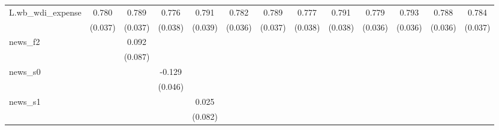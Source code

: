 {\begin{tabular}{l*{12}{c}}
\addlinespace
L.wb\_wdi\_expense&       0.780\sym{***}&       0.789\sym{***}&       0.776\sym{***}&       0.791\sym{***}&       0.782\sym{***}&       0.789\sym{***}&       0.777\sym{***}&       0.791\sym{***}&       0.779\sym{***}&       0.793\sym{***}&       0.788\sym{***}&       0.784\sym{***}\\
            &     (0.037)         &     (0.037)         &     (0.038)         &     (0.039)         &     (0.036)         &     (0.037)         &     (0.038)         &     (0.038)         &     (0.036)         &     (0.036)         &     (0.036)         &     (0.037)         \\
\addlinespace
news\_f2     &                     &       0.092         &                     &                     &                     &                     &                     &                     &                     &                     &                     &                     \\
            &                     &     (0.087)         &                     &                     &                     &                     &                     &                     &                     &                     &                     &                     \\
\addlinespace
news\_s0     &                     &                     &      -0.129\sym{***}&                     &                     &                     &                     &                     &                     &                     &                     &                     \\
            &                     &                     &     (0.046)         &                     &                     &                     &                     &                     &                     &                     &                     &                     \\
\addlinespace
news\_s1     &                     &                     &                     &       0.025         &                     &                     &                     &                     &                     &                     &                     &                     \\
            &                     &                     &                     &     (0.082)         &                     &                     &                     &                     &                     &                     &                     &                     \\

\end{tabular}}
